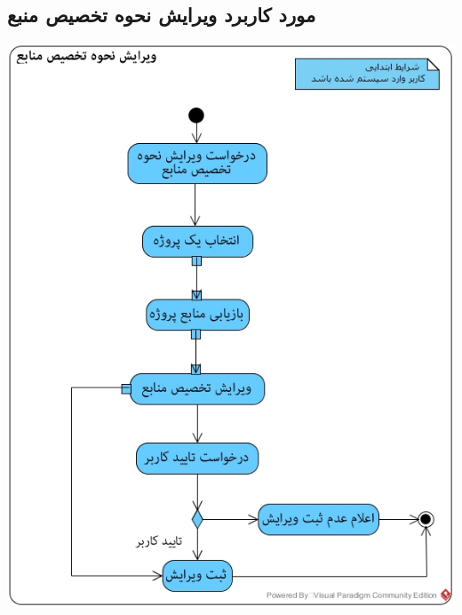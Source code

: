 \subsection*{مورد کاربرد ویرایش نحوه تخصیص منبع}
\vspace{2cm}
\begin{center}
\includegraphics[width=\textwidth]{ActivityDiagrams/37.jpg}
\end{center}

\newpage
\vspace{2cm}
